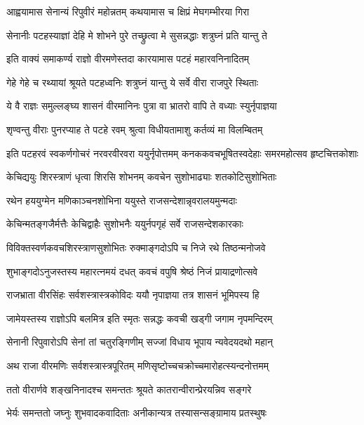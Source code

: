 \twolineshloka
{आह्वयामास सेनान्यं रिपुवीरं महोन्नतम्}
{कथयामास च क्षिप्रं मेघगम्भीरया गिरा}%


\twolineshloka
{सेनानीः पटहस्याज्ञां देहि मे शोभने पुरे}
{तच्छ्रुत्वा मे सुसन्नद्धाः शत्रुघ्नं प्रति यान्तु ते}%

\twolineshloka
{इति वाक्यं समाकर्ण्य राज्ञो वीरमणेस्तदा}
{कारयामास पटहं महारवनिनादितम्}%

\twolineshloka
{गेहे गेहे च रथ्यायां श्रूयते पटहध्वनिः}
{शत्रुघ्नं यान्तु ये सर्वे वीरा राजपुरे स्थिताः}%

\twolineshloka
{ये वै राज्ञः समुल्लङ्घ्य शासनं वीरमानिनः}
{पुत्रा वा भ्रातरो वापि ते वध्याः स्युर्नृपाज्ञया}%

\twolineshloka
{शृण्वन्तु वीराः पुनरप्याह ते पटहे रवम्}
{श्रुत्वा विधीयतामाशु कर्तव्यं मा विलम्बितम्}%


\fourlineindentedshloka
{इति पटहरवं स्वकर्णगोचरं}
{नरवरवीरवरा ययुर्नृपोत्तमम्}
{कनककवचभूषितस्वदेहाः}
{समरमहोत्सव हृष्टचित्तकोशाः}%

\twolineshloka
{केचिद्ययुः शिरस्त्राणं धृत्वा शिरसि शोभनम्}
{कवचेन सुशोभाढ्याः शतकोटिसुशोभिताः}%

\twolineshloka
{रथेन हययुग्मेन मणिकाञ्चनशोभिना}
{ययुस्ते राजसन्देशान्नृवरालयमुन्मदाः}%

\twolineshloka
{केचिन्मतङ्गजैर्मत्तैः केचिद्वाहैः सुशोभनैः}
{ययुर्नपगृहं सर्वे राजसन्देशकारकाः}%

\twolineshloka
{विविक्तस्वर्णकवचशिरस्त्राणसुशोभितः}
{रुक्माङ्गदोऽपि च निजे रथे तिष्ठन्मनोजवे}%

\twolineshloka
{शुभाङ्गदोऽनुजस्तस्य महारत्नमयं दधत्}
{कवचं वपुषि श्रेष्ठं निजं प्रायाद्रणोत्सवे}%

\twolineshloka
{राजभ्राता वीरसिंहः सर्वशस्त्रास्त्रकोविदः}
{ययौ नृपाज्ञया तत्र शासनं भूमिपस्य हि}%

\twolineshloka
{जामेयस्तस्य राज्ञोऽपि बलमित्र इति स्मृतः}
{सन्नद्धः कवची खड्गी जगाम नृपमन्दिरम्}%

\twolineshloka
{सेनानी रिपुवारोऽपि सेनां तां चतुरङ्गिणीम्}
{सज्जां विधाय भूपाय न्यवेदयदथो महान्}%

\twolineshloka
{अथ राजा वीरमणिः सर्वशस्त्रास्त्रपूरितम्}
{मणिसृष्टोच्चचक्रोच्चमारोहत्स्यन्दनोत्तमम्}%

\twolineshloka
{ततो वीरार्णवे शङ्खनिनादश्च समन्ततः}
{श्रूयते कातरान्वीरान्प्रेरयन्निव सङ्गरे}%

\twolineshloka
{भेर्यः समन्ततो जघ्नुः शुभवादकवादिताः}
{अनीकान्यत्र तस्यासन्सङ्ग्रामाय प्रतस्थुषः}%

